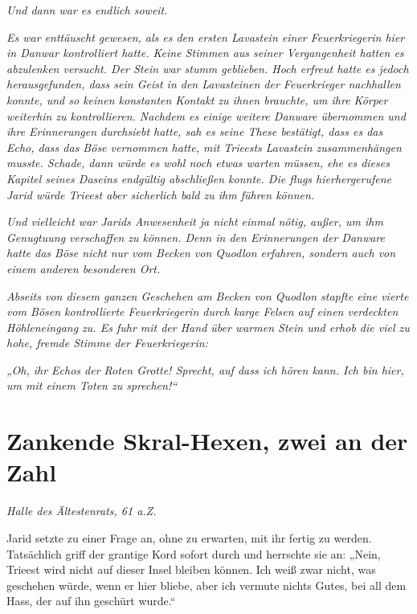 \textit{Und dann war es endlich soweit.}

\textit{Es war enttäuscht gewesen, als es den ersten Lavastein einer Feuerkriegerin hier in Danwar kontrolliert hatte. Keine Stimmen aus seiner Vergangenheit hatten es abzulenken versucht. Der Stein war stumm geblieben. Hoch erfreut hatte es jedoch herausgefunden, dass sein Geist in den Lavasteinen der Feuerkrieger nachhallen konnte, und so keinen konstanten Kontakt zu ihnen brauchte, um ihre Körper weiterhin zu kontrollieren. Nachdem es einige weitere Danware übernommen und ihre Erinnerungen durchsiebt hatte, sah es seine These bestätigt, dass es das Echo, dass das Böse vernommen hatte, mit Trieests Lavastein zusammenhängen musste. Schade, dann würde es wohl noch etwas warten müssen, ehe es dieses Kapitel seines Daseins endgültig abschließen konnte. Die flugs hierhergerufene Jarid würde Trieest aber sicherlich bald zu ihm führen können.}

\textit{Und vielleicht war Jarids Anwesenheit ja nicht einmal nötig, außer, um ihm Genugtuung verschaffen zu können. Denn in den Erinnerungen der Danware hatte das Böse nicht nur vom Becken von Quodlon erfahren, sondern auch von einem anderen besonderen Ort.}

\textit{Abseits von diesem ganzen Geschehen am Becken von Quodlon stapfte eine vierte vom Bösen kontrollierte Feuerkriegerin durch karge Felsen auf einen verdeckten Höhleneingang zu. Es fuhr mit der Hand über warmen Stein und erhob die viel zu hohe, fremde Stimme der Feuerkriegerin:}

\textit{„Oh, ihr Echos der Roten Grotte! Sprecht, auf dass ich hören kann. Ich bin hier, um mit einem Toten zu sprechen!“}













\newpage
\section{Zankende Skral-Hexen, zwei an der Zahl}





\textit{Halle des Ältestenrats, 61 a.Z.}\bigskip



Jarid setzte zu einer Frage an, ohne zu erwarten, mit ihr fertig zu werden. Tatsächlich griff der grantige Kord sofort durch und herrschte sie an: „Nein, Trieest wird nicht auf dieser Insel bleiben können. Ich weiß zwar nicht, was geschehen würde, wenn er hier bliebe, aber ich vermute nichts Gutes, bei all dem Hass, der auf ihn geschürt wurde.“

